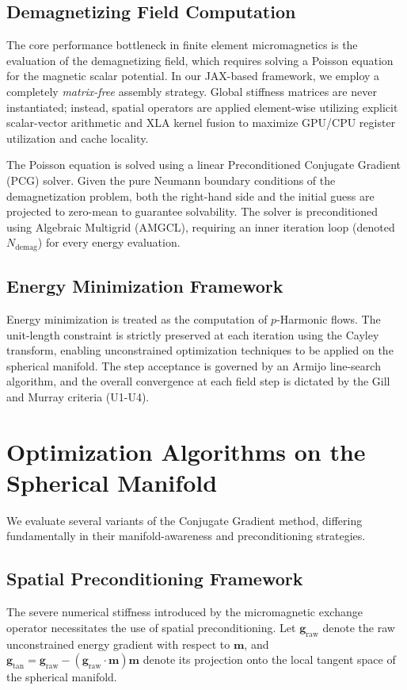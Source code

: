 \documentclass[11pt,a4paper]{article}
\begin{document}
\subsection{Demagnetizing Field Computation}
The core performance bottleneck in finite element micromagnetics is the evaluation of the demagnetizing field, which requires solving a Poisson equation for the magnetic scalar potential. In our JAX-based framework, we employ a completely \textit{matrix-free} assembly strategy. Global stiffness matrices are never instantiated; instead, spatial operators are applied element-wise utilizing explicit scalar-vector arithmetic and XLA kernel fusion to maximize GPU/CPU register utilization and cache locality.

The Poisson equation is solved using a linear Preconditioned Conjugate Gradient (PCG) solver. Given the pure Neumann boundary conditions of the demagnetization problem, both the right-hand side and the initial guess are projected to zero-mean to guarantee solvability. The solver is preconditioned using Algebraic Multigrid (AMGCL), requiring an inner iteration loop (denoted $N_{\text{demag}}$) for every energy evaluation.

\subsection{Energy Minimization Framework}
Energy minimization is treated as the computation of $p$-Harmonic flows. The unit-length constraint is strictly preserved at each iteration using the Cayley transform, enabling unconstrained optimization techniques to be applied on the spherical manifold. The step acceptance is governed by an Armijo line-search algorithm, and the overall convergence at each field step is dictated by the Gill and Murray \cite{gill1981practical} criteria (U1-U4). 

\section{Optimization Algorithms on the Spherical Manifold}
We evaluate several variants of the Conjugate Gradient method, differing fundamentally in their manifold-awareness and preconditioning strategies.

\subsection{Spatial Preconditioning Framework}
The severe numerical stiffness introduced by the micromagnetic exchange operator necessitates the use of spatial preconditioning. Let $\mathbf{g}_{\text{raw}}$ denote the raw unconstrained energy gradient with respect to $\mathbf{m}$, and $\mathbf{g}_{\text{tan}} = \mathbf{g}_{\text{raw}} - (\mathbf{g}_{\text{raw}} \cdot \mathbf{m})\mathbf{m}$ denote its projection onto the local tangent space of the spherical manifold.
\end{document}
